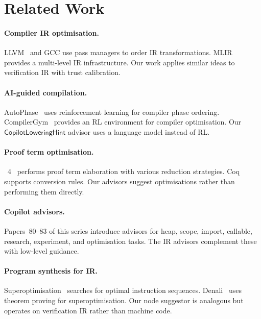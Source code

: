 \documentclass[11pt]{article}
\newcommand{\LowHint}{\mathsf{CopilotLoweringHint}}
\begin{document}
\section{Related Work}\label{sec:related}

\paragraph{Compiler IR optimisation.}
LLVM~\cite{lattner2004llvm} and GCC use pass managers to
order IR transformations.  MLIR~\cite{lattner2020mlir}
provides a multi-level IR infrastructure.  Our work
applies similar ideas to verification IR with
trust calibration.

\paragraph{AI-guided compilation.}
AutoPhase~\cite{huang2019autophase} uses reinforcement
learning for compiler phase ordering.  CompilerGym~\cite{cummins2022compilergym}
provides an RL environment for compiler optimisation.
Our $\LowHint$ advisor uses a language model instead of RL.

\paragraph{Proof term optimisation.}
\LEAN{}~4~\cite{moura2021lean4} performs proof term
elaboration with various reduction strategies.
Coq~\cite{bertot2004coq} supports conversion rules.
Our advisors suggest optimisations rather than
performing them directly.

\paragraph{Copilot advisors.}
Papers~80--83 of this series introduce advisors for
heap, scope, import, callable, research, experiment,
and optimisation tasks.  The IR advisors complement
these with low-level guidance.

\paragraph{Program synthesis for IR.}
Superoptimisation~\cite{massalin1987superoptimizer}
searches for optimal instruction sequences.
Denali~\cite{joshi2002denali} uses theorem proving
for superoptimisation.  Our node suggestor is
analogous but operates on verification IR rather
than machine code.

\end{document}
